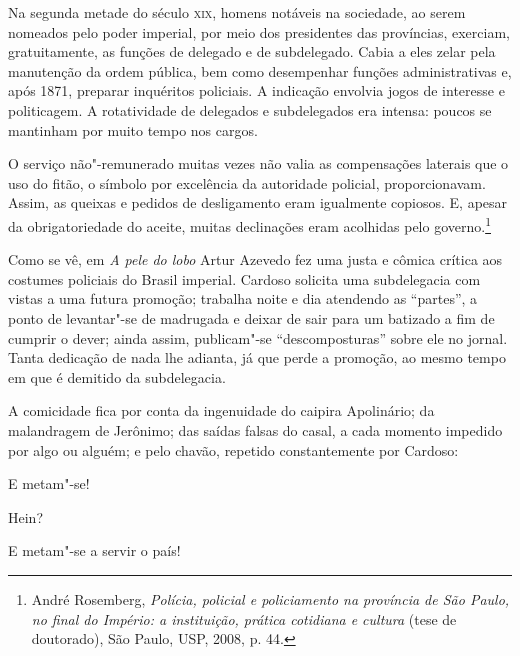 Na segunda metade do século \textsc{xix}, homens notáveis na sociedade, ao serem
nomeados pelo poder imperial, por meio dos presidentes das províncias,
exerciam, gratuitamente, as funções de delegado e de subdelegado. Cabia
a eles zelar pela manutenção da ordem pública, bem como desempenhar
funções administrativas e, após 1871, preparar inquéritos policiais. A
indicação envolvia jogos de interesse e politicagem. A rotatividade de
delegados e subdelegados era intensa: poucos se mantinham por muito
tempo nos cargos. 

\begin{hedraquote} 
O serviço não"-remunerado muitas vezes não valia as compensações laterais
que o uso do fitão, o símbolo por excelência da autoridade policial,
proporcionavam. Assim, as queixas e pedidos de desligamento eram
igualmente copiosos. E, apesar da obrigatoriedade do aceite, muitas
declinações eram acolhidas pelo governo.\footnote{ André Rosemberg,
\textit{Polícia, policial e policiamento na província de São Paulo, no
final do Império: a instituição, prática cotidiana e cultura} (tese de
doutorado), São Paulo, USP, 2008, p. 44.}  
\end{hedraquote} 

Como se vê, em \textit{A pele do lobo} Artur Azevedo fez uma justa e
cômica crítica aos costumes policiais do Brasil imperial. Cardoso
solicita uma subdelegacia com vistas a uma futura promoção; trabalha
noite e dia atendendo as “partes”, a ponto de levantar"-se de madrugada
e deixar de sair para um batizado a fim de cumprir o dever; ainda
assim, publicam"-se “descomposturas” sobre ele no jornal. Tanta
dedicação de nada lhe adianta, já que perde a promoção, ao mesmo tempo
em que é demitido da subdelegacia.

A comicidade fica por conta da ingenuidade do caipira Apolinário; da
malandragem de Jerônimo; das saídas falsas do casal, a cada momento
impedido por algo ou alguém; e pelo chavão, repetido constantemente por
Cardoso:

\begin{hedraquote}
 E metam"-se!

 Hein?

 E metam"-se a servir o país!
\end{hedraquote}

